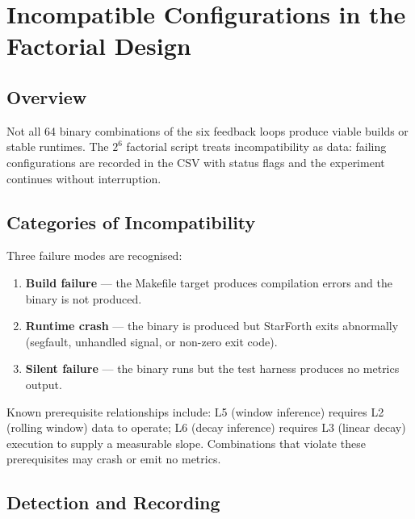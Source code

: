 
\section{Incompatible Configurations in the Factorial Design}
\label{sec:factorial-incompatible-configs}

\subsection{Overview}

Not all 64 binary combinations of the six feedback loops produce viable builds
or stable runtimes. The $2^6$ factorial script treats incompatibility as data:
failing configurations are recorded in the CSV with status flags and the
experiment continues without interruption.

\subsection{Categories of Incompatibility}

Three failure modes are recognised:

\begin{enumerate}
  \item \textbf{Build failure} — the Makefile target produces compilation errors
        and the binary is not produced.
  \item \textbf{Runtime crash} — the binary is produced but StarForth exits
        abnormally (segfault, unhandled signal, or non-zero exit code).
  \item \textbf{Silent failure} — the binary runs but the test harness produces
        no metrics output.
\end{enumerate}

Known prerequisite relationships include: L5 (window inference) requires L2
(rolling window) data to operate; L6 (decay inference) requires L3 (linear
decay) execution to supply a measurable slope. Combinations that violate
these prerequisites may crash or emit no metrics.

\subsection{Detection and Recording}

